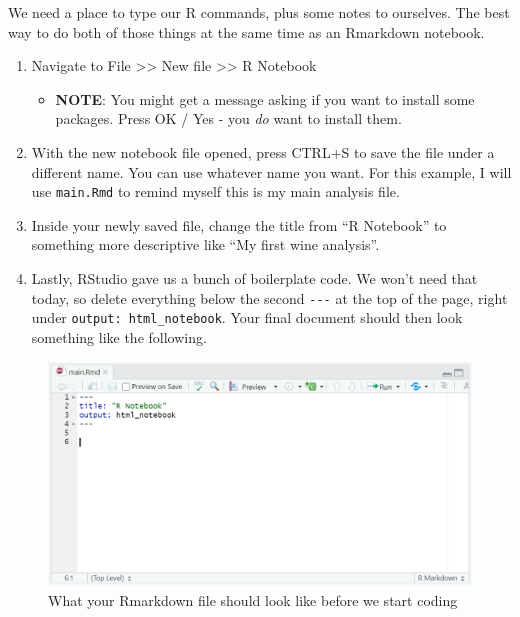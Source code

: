 \documentclass[
]{book}
\providecommand{\tightlist}{%
  \setlength{\itemsep}{0pt}\setlength{\parskip}{0pt}}
\begin{document}
We need a place to type our R commands, plus some notes to ourselves. The best way to do both of those things at the same time as an Rmarkdown notebook.

\begin{enumerate}
\def\labelenumi{\arabic{enumi}.}
\tightlist
\item
  Navigate to File \textgreater\textgreater{} New file \textgreater\textgreater{} R Notebook

  \begin{itemize}
  \tightlist
  \item
    \textbf{NOTE}: You might get a message asking if you want to install some packages. Press OK / Yes - you \emph{do} want to install them.
  \end{itemize}
\item
  With the new notebook file opened, press CTRL+S to save the file under a different name. You can use whatever name you want. For this example, I will use \texttt{main.Rmd} to remind myself this is my main analysis file.
\item
  Inside your newly saved file, change the title from ``R Notebook'' to something more descriptive like ``My first wine analysis''.
\item
  Lastly, RStudio gave us a bunch of boilerplate code. We won't need that today, so delete everything below the second \texttt{-\/-\/-} at the top of the page, right under \texttt{output:\ html\_notebook}. Your final document should then look something like the following.
\end{enumerate}

\begin{figure}

{\centering \includegraphics[width=0.8\linewidth]{images/rmarkdown_setup} 

}

\caption{What your Rmarkdown file should look like before we start coding}\label{fig:unnamed-chunk-7}
\end{figure}
\end{document}
